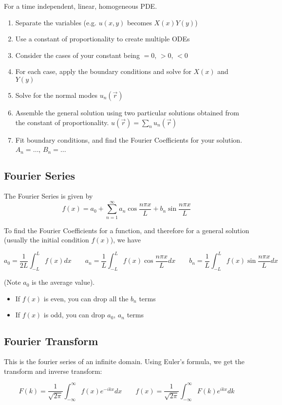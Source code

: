\documentclass{article}
\begin{document}
For a time independent, linear, homogeneous PDE.
\begin{enumerate}
	\item Separate the variables (e.g. $u(x,y)$ becomes $X(x)Y(y)$)
	\item Use a constant of proportionality to create multiple ODEs 
	\item Consider the cases of your constant being $= 0$, $> 0$, $< 0$
	\item For each case, apply the boundary conditions and solve for $X(x)$ and $Y(y)$
	\item Solve for the normal modes $u_n(\vec{r})$
	\item Assemble the general solution using two particular solutions obtained from the constant of proportionality. $u(\vec{r}) = \sum_{n} u_n (\vec{r})$
	\item Fit boundary conditions, and find the Fourier Coefficients for your solution. $A_n = \dots$, $B_n = \dots$
\end{enumerate}
\subsection{Fourier Series}
The Fourier Series is given by 
$$
f(x) = a_0 + \sum_{n=1}^{\infty} a_n \cos\frac{n\pi x}{L} + b_n \sin\frac{n\pi x}{L} 
$$

To find the Fourier Coefficients for a function, and therefore for a general solution (usually the initial condition $f(x)$), we have

$$
a_0 = \frac{1}{2L} \int_{-L}^{L} f(x) dx
\qquad
a_n = \frac{1}{L} \int_{-L}^{L} f(x) \cos\frac{n\pi x}{L} dx
\qquad
b_n = \frac{1}{L} \int_{-L}^{L} f(x) \sin\frac{n \pi x}{L} dx
$$

(Note $a_0$ is the average value).
\begin{itemize}
	\item If $f(x)$ is even, you can drop all the $b_n$ terms
	\item If $f(x)$ is odd, you can drop $a_0$, $a_n$ terms
\end{itemize}

\subsection{Fourier Transform}

This is the fourier series of an infinite domain.  Using Euler's formula, we get the transform and inverse transform:

$$
F(k) = \frac{1}{\sqrt{2\pi}} \int_{-\infty}^{\infty} f(x) e^{-ikx}dx 
\qquad
f(x) = \frac{1}{\sqrt{2\pi}} \int_{-\infty}^{\infty} F(k) e^{ikx}dk
$$
\end{document}
